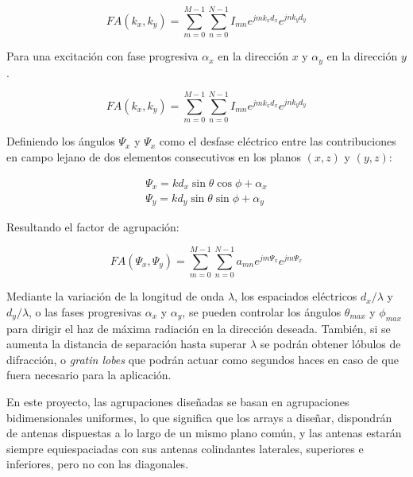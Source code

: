 \begin{equation}
	FA (k_{x},k_{y}) =\sum_{m=0}^{M-1} \sum_{n=0}^{N-1} I_{mn}e^{jmk_{x}d_{x}}e^{jnk_{y}d_{y}}
	\label{eq:fabinom}
\end{equation}

\par Para una excitación con fase progresiva $\alpha_{x}$ en la dirección $x$ y $\alpha_{y}$ en la dirección $y$. \cite{Cardama2002}

\begin{equation}
	FA (k_{x},k_{y}) =\sum_{m=0}^{M-1} \sum_{n=0}^{N-1} I_{mn}e^{jmk_{x}d_{x}}e^{jnk_{y}d_{y}}
	\label{eq:excitbinom}
\end{equation}

\par Definiendo los ángulos $\Psi_{x}$ y $\Psi_{x}$ como el desfase eléctrico entre las contribuciones en campo lejano de dos elementos consecutivos en los planos $(x,z)$ y $(y,z)$: \cite{Cardama2002}

\begin{equation}
	\begin{matrix}
\Psi_{x}=kd_{x}\sin\theta\cos\phi+\alpha_{x}
 \\
\Psi_{y}=kd_{y}\sin\theta\sin\phi+\alpha_{y}
\end{matrix}
	\label{eq:sinsin}
\end{equation}

\par Resultando el factor de agrupación: \cite{Cardama2002}

\begin{equation}
	FA (\Psi_{x},\Psi_{y}) =\sum_{m=0}^{M-1} \sum_{n=0}^{N-1} a_{mn}e^{jm\Psi_{x}}e^{jm\Psi_{x}}
	\label{eq:fatipo2}
\end{equation}

\par Mediante la variación de la longitud de onda $\lambda$, los espaciados eléctricos $d_{x}/\lambda$ y $d_{y}/\lambda$, o las fases progresivas $\alpha_{x}$ y $\alpha_{y}$, se pueden controlar los ángulos $\theta_{max}$ y $\phi_{max}$ para dirigir el haz de máxima radiación en la dirección deseada. También, si se aumenta la distancia de separación hasta superar $\lambda$ se podrán obtener lóbulos de difracción, o \textit{gratin lobes} que podrán actuar como segundos haces en caso de que fuera necesario para la aplicación.
\\
\par En este proyecto, las agrupaciones diseñadas se basan en agrupaciones bidimensionales uniformes, lo que significa que los arrays a diseñar, dispondrán de antenas dispuestas a lo largo de un mismo plano común, y las antenas estarán siempre equiespaciadas con sus antenas colindantes laterales, superiores e inferiores, pero no con las diagonales. 

